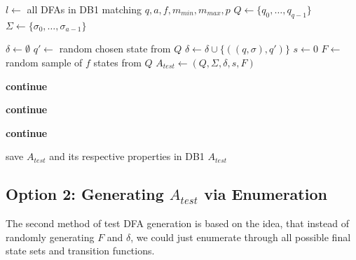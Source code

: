 \vspace{0.2cm}
\begin{algorithmic}[1]
	
		\vspace{0.2cm}
	
		\State $l \gets$ all DFAs in DB1 matching $q, a, f, m_{min}, m_{max}, p$
		\State $Q \gets \{q_0, \ldots, q_{q-1}\}$
		\State $\Sigma \gets \{\sigma_0, \ldots, \sigma_{a-1}\}$
		
		\vspace{0.2cm}
		
		
		\vspace{0.2cm}
		
			\State $\delta \gets \emptyset$
					\State $q' \gets$ random chosen state from $Q$
					\State $\delta \gets \delta \cup \{((q,\sigma),q')\}$
				\EndFor
			\EndFor
			\State $s \gets 0$
			\State $F \gets$ random sample of $f$ states from $Q$
			\State $A_{test} \gets (Q, \Sigma, \delta, s, F)$
			
			\vspace{0.2cm}
			
			\State \textbf{continue}
			\EndIf
			
			\State \textbf{continue}
			\EndIf
			
			\State \textbf{continue}
			\EndIf
			
			\vspace{0.2cm}
			
			\State save $A_{test}$ and its respective properties in DB1
			\State\Return $A_{test}$
		\EndWhile
	\EndFunction
\end{algorithmic}
\vspace{0.2cm}

\subsection{Option 2: Generating $A_{test}$ via Enumeration}


The second method of test DFA generation is based on the idea, that instead of randomly generating $F$ and $\delta$, we could just enumerate through all possible final state sets and transition functions.

